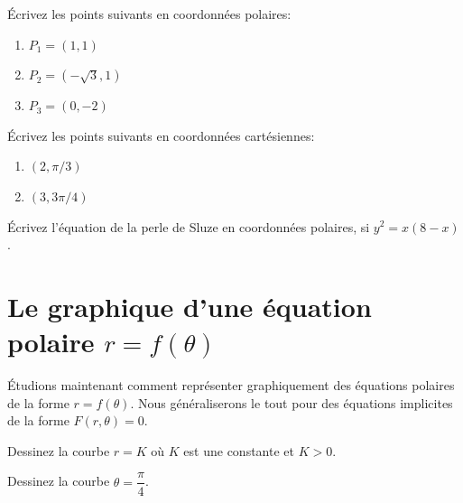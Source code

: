 \documentclass[]{book}
\providecommand{\tightlist}{%
  \setlength{\itemsep}{0pt}\setlength{\parskip}{0pt}}
\theoremstyle{definition}
\theoremstyle{definition}
\theoremstyle{definition}
\theoremstyle{remark}
\let\BeginKnitrBlock\begin \let\EndKnitrBlock\end
\begin{document}
\BeginKnitrBlock{example}
\protect\hypertarget{exm:unnamed-chunk-96}{}{\label{exm:unnamed-chunk-96}
}Écrivez les points suivants en coordonnées polaires:

\begin{enumerate}
\def\labelenumi{\alph{enumi}.}
\tightlist
\item
  \(P_1=(1,1)\)
\item
  \(P_2=(-\sqrt{3},1)\)
\item
  \(P_3=(0,-2)\)
\end{enumerate}
\EndKnitrBlock{example}
\vspace*{10cm}

\BeginKnitrBlock{example}
\protect\hypertarget{exm:unnamed-chunk-97}{}{\label{exm:unnamed-chunk-97}
}Écrivez les points suivants en coordonnées cartésiennes:

\begin{enumerate}
\def\labelenumi{\alph{enumi}.}
\tightlist
\item
  \((2,\pi/3)\)
\item
  \((3,3\pi/4)\)
\end{enumerate}
\EndKnitrBlock{example}
\vspace*{10cm}

\BeginKnitrBlock{example}
\protect\hypertarget{exm:unnamed-chunk-98}{}{\label{exm:unnamed-chunk-98}
}Écrivez l'équation de la perle de Sluze en coordonnées polaires, si
\(y^2=x(8-x)\).
\EndKnitrBlock{example}
\vspace*{6cm}

\hypertarget{le-graphique-dune-equation-polaire-rftheta}{%
\section{\texorpdfstring{Le graphique d'une équation polaire
\(r=f(\theta)\)}{Le graphique d'une équation polaire r=f(\textbackslash{}theta)}}\label{le-graphique-dune-equation-polaire-rftheta}}

Étudions maintenant comment représenter graphiquement des équations
polaires de la forme \(r=f(\theta)\). Nous généraliserons le tout pour
des équations implicites de la forme \(F(r,\theta)=0\).

\BeginKnitrBlock{example}
\protect\hypertarget{exm:unnamed-chunk-99}{}{\label{exm:unnamed-chunk-99}
}Dessinez la courbe \(r=K\) où \(K\) est une constante et \(K>0\).
\EndKnitrBlock{example}
\vspace*{5cm}

\BeginKnitrBlock{example}
\protect\hypertarget{exm:unnamed-chunk-100}{}{\label{exm:unnamed-chunk-100}
}Dessinez la courbe \(\theta=\dfrac{\pi}{4}\).
\EndKnitrBlock{example}
\vspace*{5cm}
\end{document}
